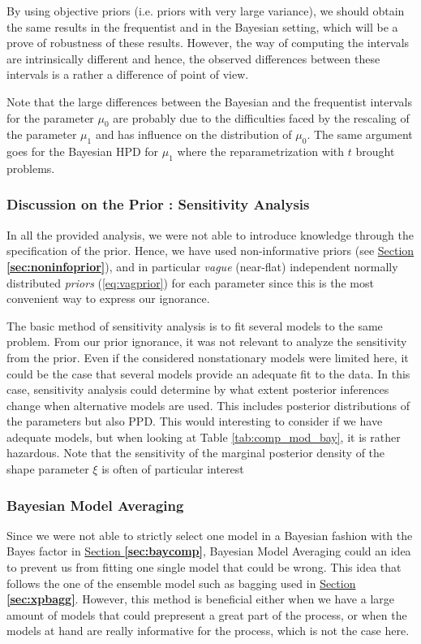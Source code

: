 By using objective priors (i.e. priors with very large variance), we should obtain the same results in the frequentist and in the Bayesian setting, which will be a prove of robustness of these results. However, the way of computing the intervals are intrinsically different and hence, the observed differences between these intervals is a rather a difference of point of view.

Note that the large differences between the Bayesian and the frequentist intervals for the parameter $\mu_0$ are probably due to the difficulties faced by the rescaling of the parameter $\mu_1$ and has influence on the distribution of $\mu_0$. The same argument goes for the Bayesian HPD for $\mu_1$ where the reparametrization with $t$ brought problems.


\subsubsection*{Discussion on the Prior : Sensitivity Analysis}

In all the provided analysis, we were not able to introduce knowledge through the specification of the prior. Hence, we have used non-informative priors (see \hyperref[sec:noninfoprior]{Section \textbf{\ref{sec:noninfoprior}}}), and in particular \emph{vague} (near-flat) independent normally distributed \emph{priors} (\ref{eq:vagprior}) for each parameter since this is the most convenient way to express our ignorance.

The basic method of sensitivity analysis is to fit several models to the same problem. From our prior ignorance, it was not relevant to analyze the sensitivity from the prior. 
Even if the considered nonstationary models were limited here, it could be the case that several models provide an adequate fit to the data. In this case, sensitivity analysis could determine by what extent posterior inferences change when alternative models are used.
This includes posterior distributions of the parameters but also PPD. This would interesting to consider if we have adequate models, but when looking at Table \ref{tab:comp_mod_bay}, it is rather hazardous. 
Note that the sensitivity of the marginal posterior density of the shape parameter $\xi$ is often of particular interest


\subsubsection*{Bayesian Model Averaging}\label{sec:bmaxp}

Since we were not able to strictly select one model in a Bayesian fashion with the Bayes factor in \hyperref[sec:baycomp]{Section \textbf{\ref{sec:baycomp}}}, Bayesian Model Averaging could an idea to prevent us from fitting one single model that could be wrong.
This idea that follows the one of the ensemble model such as bagging used in \hyperref[sec:xpbagg]{Section \textbf{\ref{sec:xpbagg}}}. However, this method is beneficial either when we have a large amount of models that could prepresent a great part of the process, or when the models at hand are really informative for the process, which is not the case here.



